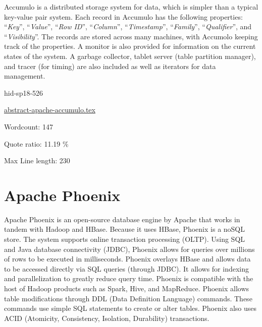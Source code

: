 Accumulo is a distributed storage system for data, which is simpler than a
typical key-value pair system. Each record in Accumulo has the following
properties: \color{blue}``\emph{Key}''\color{black}, \color{blue}``\emph{Value}''\color{black}, \color{blue}``\emph{Row ID}''\color{black}, \color{blue}``\emph{Column}''\color{black}, \color{blue}``\emph{Timestamp}''\color{black},
\color{blue}``\emph{Family}''\color{black}, \color{blue}``\emph{Qualifier}''\color{black}, and \color{blue}``\emph{Visibility}''\color{black}. The records are stored across
many machines, with Accumolo keeping track of the properties. A monitor is
also provided for information on the current states of the system. A garbage
collector, tablet server (table partition manager), and tracer (for timing)
are also included as well as iterators for data management.



\begin{IU}

hid-sp18-526

\href{https://github.com/cloudmesh-community/hid-sp18-526/blob/master//technology/abstract-apache-accumulo.tex}{abstract-apache-accumulo.tex}

 

Wordcount: 147


Quote ratio: 11.19 \%
 
Max Line length: 230
\end{IU}

\section{Apache Phoenix}

Apache Phoenix\cite{hid-sp18-526-www-apache-phoenix} is an open-source
database engine by Apache that works in tandem with Hadoop and HBase. Because
it uses HBase, Phoenix is a noSQL store. The system supports online
transaction processing (OLTP). Using SQL and Java database connectivity
(JDBC), Phoenix allows for queries over millions of rows to be executed in
milliseconds. Phoenix overlays HBase and allows data to be accessed directly
via SQL queries (through JDBC). It allows for indexing and parallelization
to greatly reduce query time. Phoenix is compatible with the host of Hadoop
products such as Spark, Hive, and MapReduce. Phoenix allows table modifications
through DDL (Data Definition Language) commands. These commands use simple
SQL statements to create or alter tables. Phoenix also uses ACID (Atomicity,
Consistency, Isolation, Durability) transactions.

